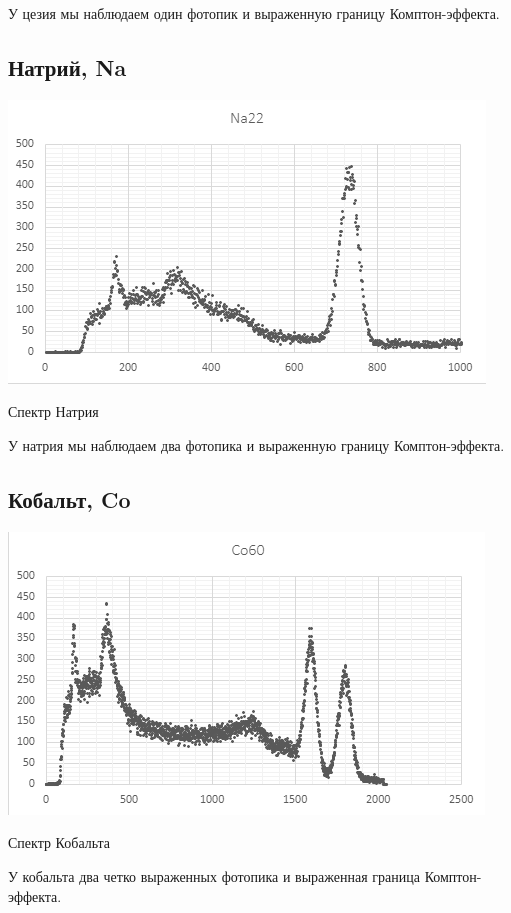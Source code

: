 \documentclass[a4paper,12pt]{article} %
\begin{document}
У цезия мы наблюдаем один фотопик и выраженную границу Комптон-эффекта.

\subsection*{Натрий, Na}
\begin{center}
\includegraphics[scale=0.4]{Na}

Спектр Натрия
\end{center}

У натрия мы наблюдаем два фотопика и выраженную границу Комптон-эффекта.

\subsection*{Кобальт, Co}
\begin{center}
\includegraphics[scale=0.4]{Co}

Спектр Кобальта
\end{center} 

У кобальта два четко выраженных фотопика и выраженная граница Комптон-эффекта.
\end{document}
